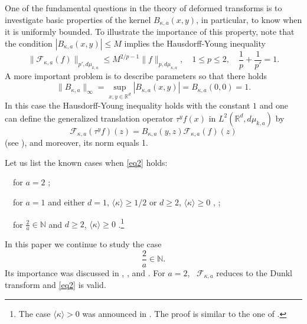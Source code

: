 \documentclass[12pt,twoside,reqno]{amsart}\usepackage[cp1251]{inputenc}
\theoremstyle{plain}
\theoremstyle{remark}
\begin{document}
One of the fundamental questions in the theory of deformed transforms is to
investigate basic  properties of the kernel $B_{\kappa,a}(x,y)$, in
particular, to know when it is uniformly bounded. To illustrate the importance
of this property, note that  the condition $|B_{\kappa,a}(x,y)|\le M$ implies the
Hausdorff-Young inequality
\[
\bigl\|\mathcal{F}_{\kappa,a}(f)\bigr\|_{p',d\mu_{k,a}}\le
M^{2/p-1}\bigl\|f\bigr\|_{p,d\mu_{\kappa,a}},\quad
1\le p\le 2,\quad \frac{1}{p}+\frac{1}{p'}=1.
\]
A more important problem is to describe parameters so that there holds
\begin{equation}\label{eq2}
\|B_{\kappa,a}\|_{\infty}=\sup_{x,y\in\mathbb{R}^{d}}|B_{\kappa,a}(x,y)|=B_{\kappa,a}(0,0)=1.
\end{equation}
In this  case the Hausdorff-Young inequality  holds with the constant $1$ and one can define the generalized translation operator $\tau^yf(x)$ in
$L^{2}(\mathbb{R}^{d},d\mu_{k,a})$  by %
\[
\mathcal{F}_{\kappa,a}(\tau^yf)(z)=B_{\kappa,a}(y,z)\mathcal{F}_{\kappa,a}(f)(z)
\]
(see \cite{GIT16}), and moreover, its norm equals  1.

Let us list the known cases when \eqref{eq2} holds:

\smallbreak
\textbullet\ \ for $a=2$ \cite{Ro99};

\smallbreak
\textbullet\ \ for $a=1$ and either $d=1$, $\langle\kappa\rangle\ge 1/2$ or $d\ge 2$, $\langle\kappa\rangle\ge 0$ \cite[Propositions~5.10, 5.11]{SKO12}, \cite[Sect. 6]{GIT16};

\smallbreak
\textbullet\ \ for $\frac{2}{a}\in\mathbb{N}$ and $d\ge 2$, $ \langle\kappa\rangle\ge 0$ \cite{BIE13,CBL18}.\;\footnote{The case $ \langle\kappa\rangle> 0$ was announced in \cite[Remark 3]{CBL18}. The proof is similar to the one of \cite[Theorem 9]{CBL18}.}

\smallbreak
In this paper we continue to study the case
\[
\frac{2}{a}\in\mathbb{N}.%
\]
Its importance was discussed in    \cite{SKO12}, \cite{BNS}, and \cite{CBL18}.
For $a=2$, \
$\mathcal{F}_{\kappa,a}$
reduces to the Dunkl transform and \eqref{eq2} is valid.
\end{document}
